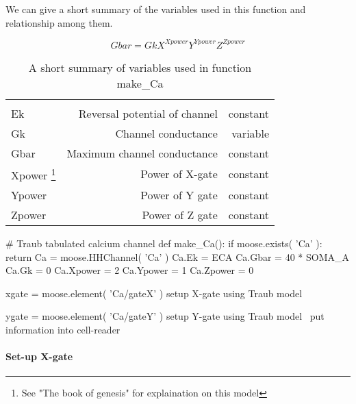 \documentclass[]{article}%
\begin{document}
 We can give a short summary of the variables used in this function and
 relationship among them.

\begin{equation}
Gbar = {Gk}X^{Xpower}Y^{Ypower}Z^{Zpower}
\end{equation}

\begin{table}[h!]
\centering
 \begin{tabular}[h]{lrr}
 \hline \\
 Ek & Reversal potential of channel & constant\\
 Gk & Channel conductance & variable \\
 Gbar & Maximum channel conductance & constant \\
 Xpower \footnote{See "The book of genesis" for explaination on this model}
        & Power of X-gate & constant \\ 
 Ypower & Power of Y gate & constant \\
 Zpower & Power of Z gate & constant \\
 \hline 
 \end{tabular}
 \caption{A short summary of variables used in function {\Tt{}make{\_}Ca\nwendquote}}
 
\end{table}


\nwenddocs{}\endmoddef\nwstartdeflinemarkup{}\nwenddeflinemarkup
# Traub tabulated calcium channel
def make_Ca():
  if moose.exists( 'Ca' ):
      return
  Ca = moose.HHChannel( 'Ca' )
  Ca.Ek = ECA
  Ca.Gbar = 40 * SOMA_A
  Ca.Gk = 0
  Ca.Xpower = 2
  Ca.Ypower = 1
  Ca.Zpower = 0

  xgate = moose.element( 'Ca/gateX' )
  \LA{}setup X-gate using Traub model~{\nwtagstyle{}}\RA{}

  ygate = moose.element( 'Ca/gateY' )
  \LA{}setup Y-gate using Traub model~{\nwtagstyle{}}\RA{}
  \LA{}put information into cell-reader~{\nwtagstyle{}}\RA{}
\nwendcode{}\nwdocspar

\paragraph{Set-up X-gate}
\end{document}
